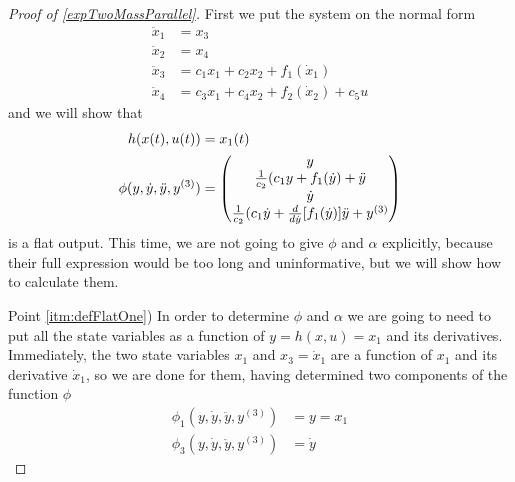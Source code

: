 \documentclass[12pt]{article}
\begin{document}
\begin{proof}[ Proof of \ref{expTwoMassParallel}]
  First we put the system on the normal form
  \begin{equation}\begin{aligned}
    \ddot{x}_1 &= x_3 \\
    \ddot{x}_2 &= x_4 \\
    \ddot{x}_3 &= c_1 x_1 + c_2 x_2 + f_1(\dot{x}_1) \\
    \ddot{x}_4 &= c_3 x_1 + c_4 x_2 + f_2(\dot{x}_2) + c_5u    
  \end{aligned}\end{equation}
  and we will show that
  \begin{equation}\begin{aligned}
    h(x(t),u(t)) &= x_1(t) \\
    \phi(y, \dot{y}, \ddot{y}, y^{(3)} ) &=
    \begin{pmatrix}
      y \\
      \frac{1}{c_2} ( c_1 y + f_1(\dot{y}) + \ddot{y} \\
      \dot{y} \\
      \frac{1}{c_2} ( c_1 \dot{y} + \frac{d}{d\dot{y}} [f_1(\dot{y})]\ddot{y} + y^{(3)}
    \end{pmatrix}
  \end{aligned}\end{equation}
  is a flat output.
  This time, we are not going to give $\phi$ and $\alpha$ explicitly, because their
  full expression would be too long and uninformative, but we will show how to
  calculate them.
  
  Point \ref{itm:defFlatOne}) In order to determine $\phi$ and $\alpha$ we are
  going to need to put all the state variables as a function of $y = h(x,u) = x_1$ and its derivatives.
  Immediately, the two state variables $x_1$ and $x_3 = \dot{x}_1$ are a function of $x_1$
  and its derivative $\dot{x}_1$, so we are done for them, having determined two components of the function $\phi$
  \begin{equation}\begin{aligned}
    \phi_1(y, \dot{y}, \ddot{y}, y^{(3)}) &= y = x_1 \\
    \phi_3(y, \dot{y}, \ddot{y}, y^{(3)}) &= \dot{y}
  \end{aligned}\end{equation}


\end{proof}
\end{document}
